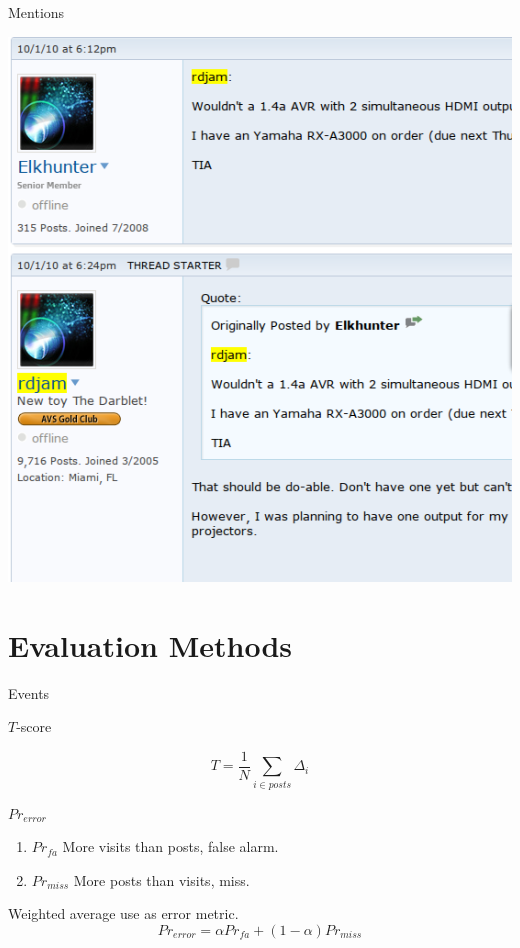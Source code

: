 \documentclass[12pt]{presentation}
\begin{document}
\begin{frame}{Mentions}
	\begin{center}
		\includegraphics[scale=0.4]{screenshots/replies.png}\\
	\end{center}
\end{frame}


\section{Evaluation Methods}
\begin{frame}{Events}
\begin{center}
	
\end{center}
\end{frame}
\begin{frame}{$T$-score}
\begin{center}
	
\end{center}
\[
	T = \frac{1}{N} \sum_{i \in posts} \Delta_i
\]
\end{frame}
\begin{frame}{$Pr_{error}$}
	\begin{center}
	
\end{center}
\begin{enumerate}
	\item $Pr_{fa}$ More visits than posts, false alarm.
	\item $Pr_{miss}$ More posts than visits, miss.
\end{enumerate}
Weighted average use as error metric.
\[Pr_{error} = \alpha Pr_{fa} + (1 - \alpha) Pr_{miss}\]
\end{frame}
\end{document}
